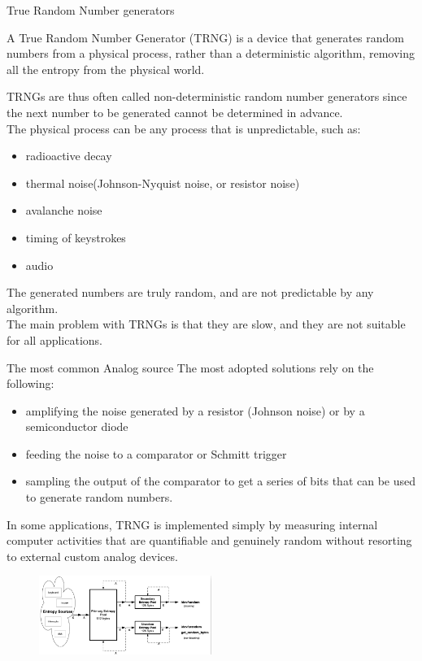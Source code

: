 \begin{section}{True Random Number generators}
  \begin{boxH}
    A True Random Number Generator (TRNG) is a device that generates random numbers from a physical 
    process, rather than a deterministic algorithm, removing all the entropy from the physical world.
  \end{boxH}
  TRNGs are thus often called non-deterministic random number generators since the next number to 
  be generated cannot be determined in advance.\\
  The physical process can be any process that is unpredictable, such as:
  \begin{itemize}
    \item radioactive decay
    \item thermal noise(Johnson-Nyquist noise, or resistor noise)
    \item avalanche noise
    \item timing of keystrokes
    \item audio
  \end{itemize}
  The generated numbers are truly random, and are not predictable by any algorithm.\\
  The main problem with TRNGs is that they are slow, and they are not suitable for all applications.
  \begin{paragraph}{The most common Analog source}
    The most adopted solutions rely on the following:
    \begin{itemize}
      \item amplifying the noise generated by a resistor (Johnson noise) or by a semiconductor diode
      \item feeding the noise to a comparator or Schmitt trigger
      \item sampling the output of the comparator to get a series of bits that can be used to
        generate random numbers.
    \end{itemize}
  \end{paragraph}
  In some applications, TRNG is implemented simply by measuring internal computer activities that are quantifiable and genuinely random without
  resorting to external custom analog devices.
  \begin{figure}
    \centering
    \includegraphics[width=0.5\textwidth]{img/hardware/linux rng.png}

\end{figure}
\end{section}
